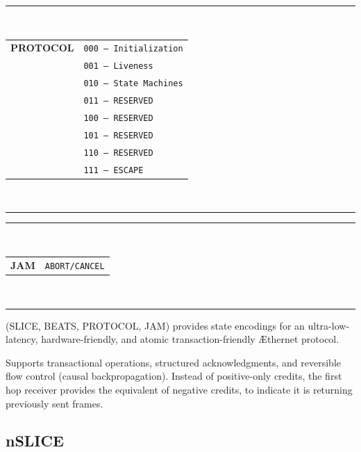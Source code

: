 \documentclass[../../../OAE-SPEC-MAIN.tex]{subfiles}
\begin{document}
\begin{margintable}
  \centering
  \footnotesize
  \rule{5.4cm}{0.8pt}\\
  \begin{tabular}{@{}cl@{}}
    \textbf{PROTOCOL} & \texttt{000 — Initialization} \\
                      & \texttt{001 — Liveness} \\
                      & \texttt{010 — State Machines} \\
                      & \texttt{011 — RESERVED} \\
                      & \texttt{100 — RESERVED} \\
                      & \texttt{101 — RESERVED} \\
                      & \texttt{110 — RESERVED} \\
                      & \texttt{111 — ESCAPE} \\
  \end{tabular}\\
  \rule{5.4cm}{0.6pt}
\end{margintable}

\begin{margintable}
  \centering
  \footnotesize
  \rule{5.4cm}{0.8pt}\\
  \begin{tabular}{@{}cl@{}}
    \textbf{JAM} & \texttt{ABORT/CANCEL} \\
  \end{tabular}\\
  \rule{5.4cm}{0.6pt}
\end{margintable}

(SLICE, BEATS, PROTOCOL, JAM) provides state encodings for an ultra-low-latency, hardware-friendly, and atomic transaction-friendly \AE thernet protocol.

Supports transactional operations, structured acknowledgments, and reversible flow control (causal backpropagation). Instead of positive-only credits, the first hop receiver provides the equivalent of negative credits, to indicate it is returning previously sent frames. %

\subsection{nSLICE}
\end{document}

